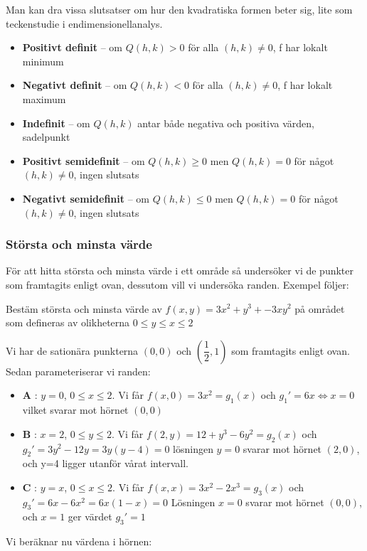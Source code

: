 \documentclass[12pt]{article} %
\begin{document}
Man kan dra vissa slutsatser om hur den kvadratiska formen beter sig, lite som teckenstudie i endimensionellanalys.

\begin{itemize}
    \item \textbf{Positivt definit} -- om $Q(h,k) > 0$ för alla $(h,k) \neq 0$, f har lokalt minimum
    \item \textbf{Negativt definit} -- om $Q(h,k) < 0$ för alla $(h,k) \neq 0$, f har lokalt maximum
    \item \textbf{Indefinit} -- om $Q(h,k)$ antar både negativa och positiva värden, sadelpunkt
    \item \textbf{Positivt semidefinit} -- om $Q(h,k) \geq 0$ men $Q(h,k) = 0$ för något $(h,k) \neq 0$, ingen slutsats
    \item \textbf{Negativt semidefinit} -- om $Q(h,k) \leq 0$ men $Q(h,k) = 0$ för något $(h,k) \neq 0$, ingen slutsats
\end{itemize}

\subsubsection{Största och minsta värde}

För att hitta största och minsta värde i ett område så undersöker vi de punkter som framtagits enligt ovan, dessutom vill vi undersöka randen. Exempel följer:

\par Bestäm största och minsta värde av $f(x,y) = 3x^2 + y^3 + -3xy^2$ på området som defineras av olikheterna $0 \leq y \leq x \leq 2$

\par Vi har de sationära punkterna $(0,0)$ och $(\dfrac{1}{2},1)$ som framtagits enligt ovan. Sedan parameteriserar vi randen:

\begin{itemize}
    \item \textbf{A} : $y = 0$, $0 \leq x \leq 2$. Vi får $f(x, 0) = 3x^2 = g_{1}(x)$ och $g_{1}' = 6x \Leftrightarrow x = 0$ vilket svarar mot hörnet $(0,0)$ 
    \item \textbf{B} : $x = 2$, $0 \leq y \leq 2$. Vi får $f(2, y) = 12 + y^3 -6y^2 = g_{2}(x)$ och $g_{2}' = 3y^2 -12y =3y(y-4) = 0$ lösningen $y=0$ svarar mot hörnet $(2,0)$, och y=4 ligger utanför vårat intervall.
    \item \textbf{C} : $y = x$, $0 \leq x \leq 2$. Vi får $f(x, x) = 3x^2 - 2x^3 = g_{3}(x)$ och $g_{3}' = 6x -6x^2 = 6x(1-x) = 0$ Lösningen $x = 0$ svarar mot hörnet $(0,0)$, och $x = 1$ ger värdet $g_{3}' = 1$
\end{itemize}
Vi beräknar nu värdena i hörnen:
\end{document}
